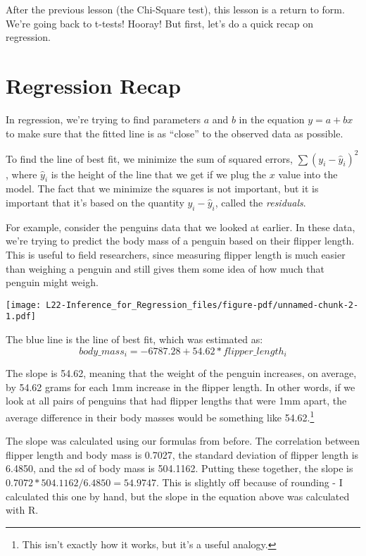 \documentclass[
  letterpaper,
  DIV=11,
  numbers=noendperiod]{scrreprt}
\begin{document}
After the previous lesson (the Chi-Square test), this lesson is a return
to form. We're going back to t-tests! Hooray! But first, let's do a
quick recap on regression.

\hypertarget{regression-recap}{%
\section{Regression Recap}\label{regression-recap}}

In regression, we're trying to find parameters \(a\) and \(b\) in the
equation \(y = a + bx\) to make sure that the fitted line is as
``close'' to the observed data as possible.

To find the line of best fit, we minimize the sum of squared errors,
\(\sum(y_i - \hat y_i)^2\), where \(\hat y_i\) is the height of the line
that we get if we plug the \(x\) value into the model. The fact that we
minimize the squares is not important, but it is important that it's
based on the quantity \(y_i - \hat y_i\), called the \emph{residuals}.

For example, consider the penguins data that we looked at earlier. In
these data, we're trying to predict the body mass of a penguin based on
their flipper length. This is useful to field researchers, since
measuring flipper length is much easier than weighing a penguin and
still gives them some idea of how much that penguin might weigh.

\texttt{[image: L22-Inference\_for\_Regression\_files/figure-pdf/unnamed-chunk-2-1.pdf]}

The blue line is the line of best fit, which was estimated as: \[
body\_mass_i = -6787.28 + 54.62*flipper\_length_i
\]

The slope is 54.62, meaning that the weight of the penguin increases, on
average, by 54.62 grams for each 1mm increase in the flipper length. In
other words, if we look at all pairs of penguins that had flipper
lengths that were 1mm apart, the average difference in their body masses
would be something like 54.62.\footnote{This isn't exactly how it works,
  but it's a useful analogy.}

The slope was calculated using our formulas from before. The correlation
between flipper length and body mass is 0.7027, the standard deviation
of flipper length is 6.4850, and the sd of body mass is 504.1162.
Putting these together, the slope is
\(0.7072 * 504.1162 / 6.4850 = 54.9747\). This is slightly off because
of rounding - I calculated this one by hand, but the slope in the
equation above was calculated with R.
\end{document}
